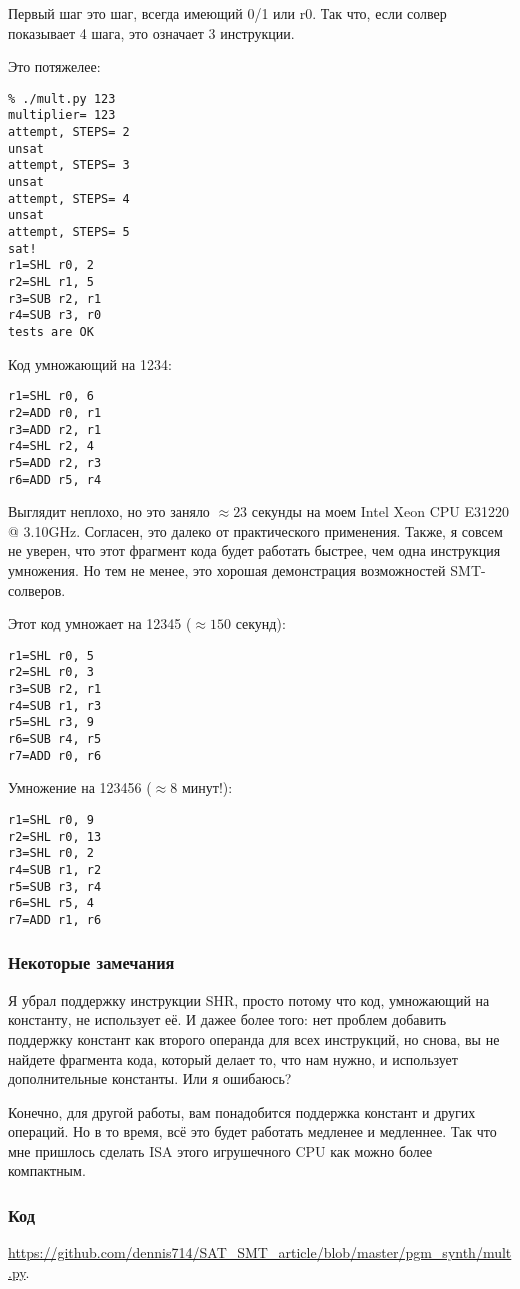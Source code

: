 Первый шаг это шаг, всегда имеющий 0/1 или r0.
Так что, если солвер показывает 4 шага, это означает 3 инструкции.

Это потяжелее:

\begin{lstlisting}
% ./mult.py 123
multiplier= 123
attempt, STEPS= 2
unsat
attempt, STEPS= 3
unsat
attempt, STEPS= 4
unsat
attempt, STEPS= 5
sat!
r1=SHL r0, 2
r2=SHL r1, 5
r3=SUB r2, r1
r4=SUB r3, r0
tests are OK
\end{lstlisting}

Код умножающий на 1234:

\begin{lstlisting}
r1=SHL r0, 6
r2=ADD r0, r1
r3=ADD r2, r1
r4=SHL r2, 4
r5=ADD r2, r3
r6=ADD r5, r4
\end{lstlisting}

Выглядит неплохо, но это заняло $\approx 23$ секунды на моем Intel Xeon CPU E31220 @ 3.10GHz.
Согласен, это далеко от практического применения.
Также, я совсем не уверен, что этот фрагмент кода будет работать быстрее, чем одна инструкция умножения.
Но тем не менее, это хорошая демонстрация возможностей SMT-солверов.

Этот код умножает на 12345 ($\approx 150$ секунд):

\begin{lstlisting}
r1=SHL r0, 5
r2=SHL r0, 3
r3=SUB r2, r1
r4=SUB r1, r3
r5=SHL r3, 9
r6=SUB r4, r5
r7=ADD r0, r6
\end{lstlisting}

Умножение на 123456 ($\approx 8$ минут!):

\begin{lstlisting}
r1=SHL r0, 9
r2=SHL r0, 13
r3=SHL r0, 2
r4=SUB r1, r2
r5=SUB r3, r4
r6=SHL r5, 4
r7=ADD r1, r6
\end{lstlisting}

\subsubsection{Некоторые замечания}

Я убрал поддержку инструкции SHR, просто потому что код, умножающий на константу, не использует её.
И дажее более того: нет проблем добавить поддержку констант как второго операнда для всех инструкций,
но снова, вы не найдете фрагмента кода, который делает то, что нам нужно, и использует дополнительные константы.
Или я ошибаюсь?

Конечно, для другой работы, вам понадобится поддержка констант и других операций.
Но в то время, всё это будет работать медленее и медленнее.
Так что мне пришлось сделать \ac{ISA} этого игрушечного \ac{CPU} как можно более компактным.

\subsubsection{Код}

\url{https://github.com/dennis714/SAT_SMT_article/blob/master/pgm_synth/mult.py}.

